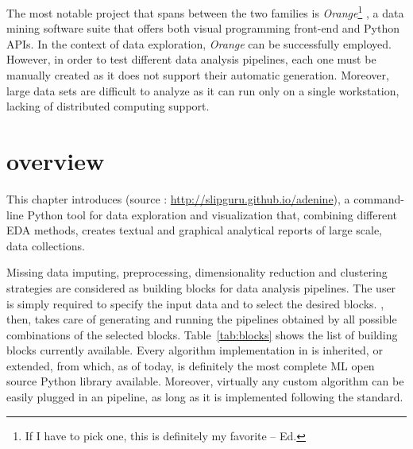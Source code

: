 The most notable project that spans between the two families is \emph{Orange}\footnote{ If I have to pick one, this is definitely my favorite -- Ed.} \cite{demvsar2013orange}, a data mining software suite that offers both visual programming front-end and Python \ac{API}s. In the context of data exploration, \emph{Orange} can be successfully employed. However, in order to test different data analysis pipelines, each one must be manually created as it does not support their automatic generation.
Moreover, large data sets are difficult to analyze as it can run only on a single workstation, lacking of distributed computing support.

\section{\ade overview} \label{sec:adenine_overview}

This chapter introduces \ade (source : \url{http://slipguru.github.io/adenine}), a command-line Python tool for data exploration and visualization that, combining different EDA methods, creates textual and graphical analytical reports of large scale, data collections.



Missing data imputing, preprocessing, dimensionality reduction and clustering strategies are considered as building blocks for data analysis pipelines. The user is simply required to specify the input data and to select the desired blocks. \ade, then, takes care of generating and running the pipelines obtained by all possible combinations of the selected blocks.
Table~\ref{tab:blocks} shows the list of building blocks currently available.
Every algorithm implementation in \ade is inherited, or extended, from \sklearn \cite{scikit-learn} which, as of today, is definitely the most complete ML open source Python library available.
Moreover, virtually any custom algorithm can be easily plugged in an \ade pipeline, as long as it is implemented following the \sklearn standard.


